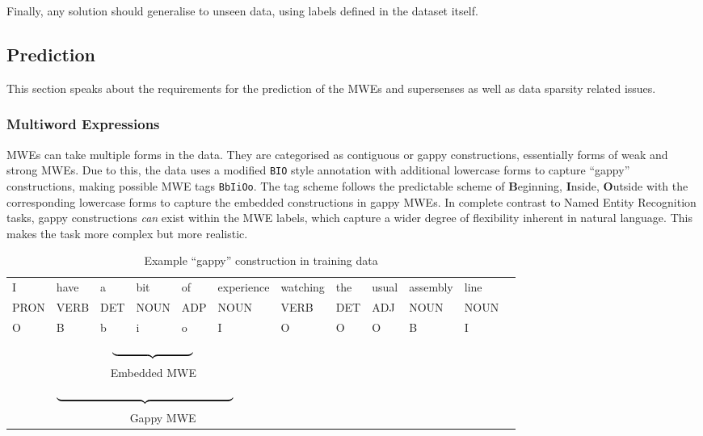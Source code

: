 Finally, any solution should generalise to unseen data, using labels defined in the dataset itself. 

\subsection{Prediction}
This section speaks about the requirements for the prediction of the MWEs and supersenses as well as data sparsity related issues.

\subsubsection{Multiword Expressions}
MWEs can take multiple forms in the \dimsum data. They are categorised as contiguous or gappy constructions, essentially forms of weak and strong MWEs. Due to this, the data uses a modified \texttt{BIO} style annotation with additional lowercase forms to capture ``gappy'' constructions, making possible MWE tags \texttt{BbIiOo}. The tag scheme follows the predictable scheme of {\bf B}eginning, {\bf I}nside, {\bf O}utside with the corresponding lowercase forms to capture the embedded constructions in gappy MWEs. In complete contrast to Named Entity Recognition tasks, gappy constructions {\it can} exist within the \dimsum MWE labels, which capture a wider degree of flexibility inherent in natural language. This makes the task more complex but more realistic.

\begin{table}[!htbp]
\small
\begin{framed}
  \centering
  \begin{ttfamily}
  \begin{tabular}{llllllllllll}
    I & have & a & bit & of & experience & watching & the & usual & assembly & line \\
    PRON & VERB & DET & NOUN & ADP & NOUN & VERB & DET & ADJ & NOUN & NOUN \\
    O & B & b & i & o & I & O & O & O & B & I \\
    \ & \ & \multicolumn{3}{c}{$\underbrace{\hspace{2.5cm}}$} & & & & & & \\ 
    \ & \ & \multicolumn{3}{c}{Embedded MWE} & & & & & & \\ 
    \ & \multicolumn{5}{l}{$\underbrace{\hspace{5.5cm}}$} & & & & & \\ 
    \ & \multicolumn{5}{c}{Gappy MWE} & & & & & \\ 
  \end{tabular}
  \end{ttfamily}
  \caption{Example ``gappy'' construction in training data}
  \label{tab:gappysentence}
\end{framed}
\end{table}


